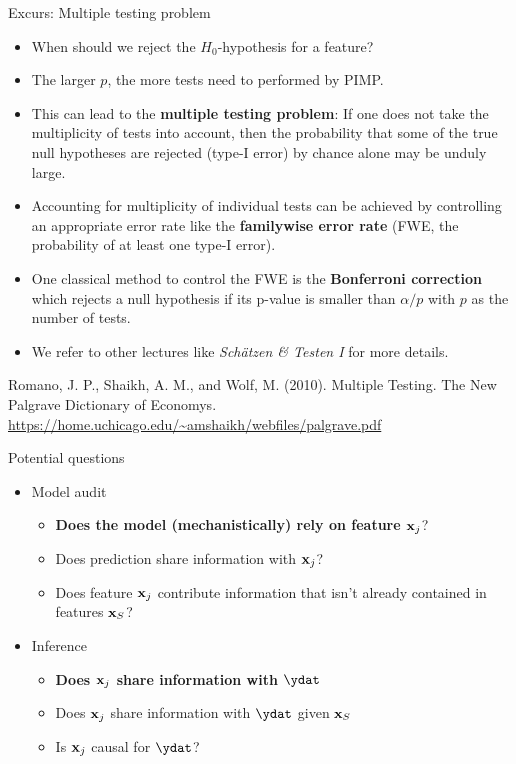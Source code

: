 \documentclass[11pt,compress,t,notes=noshow, xcolor=table]{beamer}
\begin{document}
\begin{vbframe}{Excurs: Multiple testing problem}
\begin{itemize}
  \item When should we reject the $H_0$-hypothesis for a feature? 
  \item The larger $p$, the more tests need to performed by PIMP. 
  \item This can lead to the \textbf{multiple testing problem}: If one does not take the multiplicity of tests into account, then the probability that some of the true null hypotheses are rejected (type-I error) by chance alone may be unduly large.
  \item Accounting for multiplicity of individual tests can be achieved by controlling
  an appropriate error rate like the \textbf{familywise error rate} (FWE, the probability of at least one type-I error). 
  \item One classical method to control the FWE is the \textbf{Bonferroni correction} which rejects a null hypothesis if its p-value is smaller than $\alpha/p$ with $p$ as the number of tests. 
  \item We refer to other lectures like \textit{Schätzen \& Testen I} for more details.
  \end{itemize} 
  \vspace{0.2cm}
  {\tiny{Romano, J. P., Shaikh, A. M., and Wolf, M. (2010). Multiple Testing. The New Palgrave Dictionary of Economys. \url{https://home.uchicago.edu/~amshaikh/webfiles/palgrave.pdf}}\par}
\end{vbframe}

\begin{vbframe}{Potential questions}

\begin{itemize}
  \item Model audit
  \begin{itemize}
    \item \textbf{Does the model (mechanistically) rely on feature $\xj$}?
    \item Does prediction share information with $\xj$?
    \item Does feature $\xj$ contribute information that isn't already contained in features $\xv_S$?
  \end{itemize}
  \item Inference
  \begin{itemize}
    \item \textbf{Does $\xj$ share information with $\ydat$}
    \item Does $\xj$ share information with $\ydat$ given $\xv_S$
    \item Is $\xj$ causal for $\ydat$?
  \end{itemize}
\end{itemize}

\end{vbframe}


\endlecture
\end{document}
